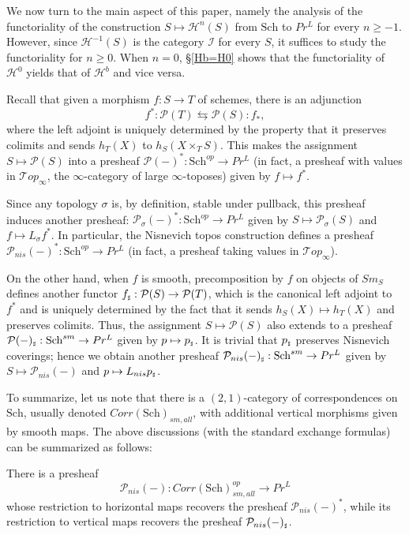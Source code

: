 We now turn to the main aspect of this paper, namely the analysis of the functoriality of the construction $S\mapsto \mathcal{H}^n(S)$ from $\mathrm{Sch}$ to $Pr^L$ for every $n\geq -1$. However, since $\mathcal{H}^{-1}(S)$ is the category $\mathcal{I}$ for every $S$, it suffices to study the functoriality for $n\geq 0$. When $n=0$, \S\ref{Hb=H0} shows that the functoriality of $\mathcal{H}^0$ yields that of $\mathcal{H}^b$ and vice versa.

Recall that given a morphism $f:S\to T$ of schemes, there is an adjunction $$f^*:\mathcal{P}(T)\leftrightarrows \mathcal{P}(S):f_*,$$ where the left adjoint is uniquely determined by the property that it preserves colimits and sends $h_T(X)$ to $h_S(X\times_TS)$. This makes the assignment $S\mapsto \mathcal{P}(S)$ into a presheaf $\mathcal{P}(-)^*:\mathrm{Sch}^{op}\to Pr^L$ (in fact, a presheaf with values in $\mathcal{T}op_\infty$, the $\infty$-category of large $\infty$-toposes) given by $f\mapsto f^*$.

Since any topology $\sigma$ is, by definition, stable under pullback, this presheaf induces another presheaf: $\mathcal{P}_{\sigma}(-)^*:\mathrm{Sch}^{op}\to Pr^L$ given by $S\mapsto \mathcal{P}_{\sigma}(S)$ and $f\mapsto L_\sigma f^*$. In particular, the Nisnevich topos construction defines a presheaf $\mathcal{P}_{nis}(-)^*:\mathrm{Sch}^{op}\to Pr^L$ (in fact, a presheaf taking values in $\mathcal{T}op_\infty$). 

On the other hand, when $f$ is smooth, precomposition by $f$ on objects of $Sm_S$ defines another functor $f_{\mathord{\text{\tiny $\sharp$}}}: \mathcal{P}(S)\to \mathcal{P}(T)$, which is the canonical left adjoint to $f^*$ and is uniquely determined by the fact that it sends $h_S(X)\mapsto h_T(X)$ and preserves colimits. Thus, the assignment $S\mapsto \mathcal{P}(S)$ also extends to a presheaf $\mathcal{P}(-)_{\mathord{\text{\tiny $\sharp$}}}:\mathrm{Sch}^{sm}\to Pr^L$ given by $p\mapsto p_{\mathord{\text{\tiny $\sharp$}}}$. It is trivial that $p_{\mathord{\text{\tiny $\sharp$}}}$ preserves Nisnevich coverings; hence we obtain another presheaf $\mathcal{P}_{nis}(-)_{\mathord{\text{\tiny $\sharp$}}}:\mathrm{Sch}^{sm}\to Pr^L$ given by $S\mapsto \mathcal{P}_{nis}(-)$ and $p\mapsto L_{nis}p_{\mathord{\text{\tiny $\sharp$}}}$. 

To summarize, let us note that there is a $(2,1)$-category of correspondences on $\mathrm{Sch}$, usually denoted $Corr(\mathrm{Sch})_{sm,all}$, with additional vertical morphisms given by smooth maps. The above discussions (with the standard exchange formulas) can be summarized as follows:
\begin{prop}
    There is a presheaf $$\mathcal{P}_{nis}(-):Corr(\mathrm{Sch})_{sm,all}^{op}\to Pr^L$$ whose restriction to horizontal maps recovers the presheaf $\mathcal{P}_{nis}(-)^*$, while its restriction to vertical maps recovers the presheaf $\mathcal{P}_{nis}(-)_{\mathord{\text{\tiny $\sharp$}}}$.
\end{prop}

